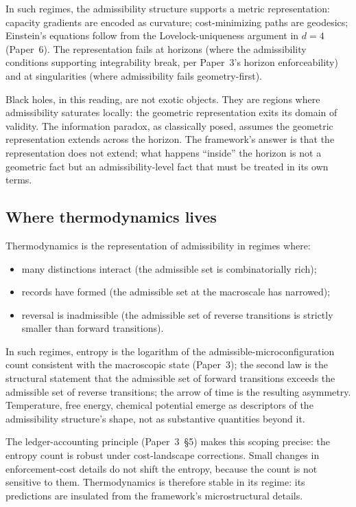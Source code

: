 \documentclass[11pt]{article}
\begin{document}
\noindent In such regimes, the admissibility structure supports a metric representation: capacity gradients are encoded as curvature; cost-minimizing paths are geodesics; Einstein's equations follow from the Lovelock-uniqueness argument in $d=4$ (Paper~6). The representation fails at horizons (where the admissibility conditions supporting integrability break, per Paper~3's horizon enforceability) and at singularities (where admissibility fails geometry-first).

Black holes, in this reading, are not exotic objects. They are regions where admissibility saturates locally: the geometric representation exits its domain of validity. The information paradox, as classically posed, assumes the geometric representation extends across the horizon. The framework's answer is that the representation does not extend; what happens ``inside'' the horizon is not a geometric fact but an admissibility-level fact that must be treated in its own terms.

\subsection{Where thermodynamics lives}\label{sec:where_thermo}

Thermodynamics is the representation of admissibility in regimes where:

\begin{itemize}
    \item many distinctions interact (the admissible set is combinatorially rich);
    \item records have formed (the admissible set at the macroscale has narrowed);
    \item reversal is inadmissible (the admissible set of reverse transitions is strictly smaller than forward transitions).
\end{itemize}

\noindent In such regimes, entropy is the logarithm of the admissible-microconfiguration count consistent with the macroscopic state (Paper~3); the second law is the structural statement that the admissible set of forward transitions exceeds the admissible set of reverse transitions; the arrow of time is the resulting asymmetry. Temperature, free energy, chemical potential emerge as descriptors of the admissibility structure's shape, not as substantive quantities beyond it.

The ledger-accounting principle (Paper~3~\S5) makes this scoping precise: the entropy count is robust under cost-landscape corrections. Small changes in enforcement-cost details do not shift the entropy, because the count is not sensitive to them. Thermodynamics is therefore stable in its regime: its predictions are insulated from the framework's microstructural details.
\end{document}
